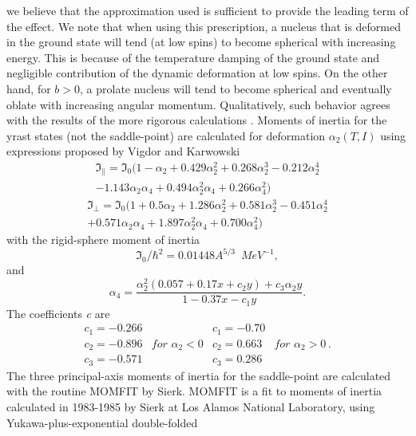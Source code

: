 \documentclass[twocolumn,amsmath,amssymb,10pt,groupedaddress,a4paper]{revtex4}
\begin{document}
we believe that the approximation used is sufficient to provide the
leading term of the effect. We note that when using this prescription,
a nucleus that is deformed in the ground state will tend (at low spins)
to become spherical with increasing energy. This is because of the
temperature damping of the ground state and negligible contribution
of the dynamic deformation at low spins. On the other hand, for $b>0$,
a prolate nucleus will tend to become spherical and eventually oblate
with increasing angular momentum. Qualitatively, such behavior agrees
with the results of the more rigorous calculations \cite{and76}.
Moments of inertia for the yrast states (not the saddle-point) are
calculated for deformation $\alpha_{2}(T,I)$ using expressions proposed
by Vigdor and Karwowski \cite{VK}
\begin{eqnarray}
\Im_{\parallel}=\Im_{0}(1-\alpha_{2}+0.429\alpha_{2}^{2}+0.268\alpha_{2}^{3}-0.212\alpha_{2}^{4}\nonumber \\
-1.143\alpha_{2}\alpha_{4}+0.494\alpha_{2}^{2}\alpha_{4}+0.266\alpha_{4}^{2})\label{MOMpar}\end{eqnarray}
\begin{eqnarray}
\Im_{\perp}=\Im_{0}(1+0.5\alpha_{2}+1.286\alpha_{2}^{2}+0.581\alpha_{2}^{3}-0.451\alpha_{2}^{4}\nonumber \\
+0.571\alpha_{2}\alpha_{4}+1.897\alpha_{2}^{2}\alpha_{4}+0.700\alpha_{4}^{2})\label{MOMort}\end{eqnarray}
with the rigid-sphere moment of inertia \begin{equation}
\Im_{0}/\hbar^{2}=0.01448A^{5/3}\,\,\, MeV^{-1},\end{equation}
and \begin{equation}
\alpha_{4}=\frac{\alpha_{2}^{2}(0.057+0.17x+c_{2}y)+c_{3}\alpha_{2}y}{1-0.37x-c_{1}y}.\end{equation}
The coefficients \emph{c} are \begin{equation}
\begin{array}{llll}
c_{1}=-0.266 &  & c_{1}=-0.70\\
c_{2}=-0.896 & for\,\,\alpha_{2}<0 & c_{2}=0.663 & for\,\,\alpha_{2}>0\,.\\
c_{3}=-0.571 &  & c_{3}=0.286\end{array}\end{equation}
The three principal-axis moments of inertia for the saddle-point are
calculated with the routine MOMFIT \cite{sierk} by Sierk. MOMFIT
is a fit to moments of inertia calculated in 1983-1985 by Sierk at
Los Alamos National Laboratory, using Yukawa-plus-exponential double-folded
\end{document}
